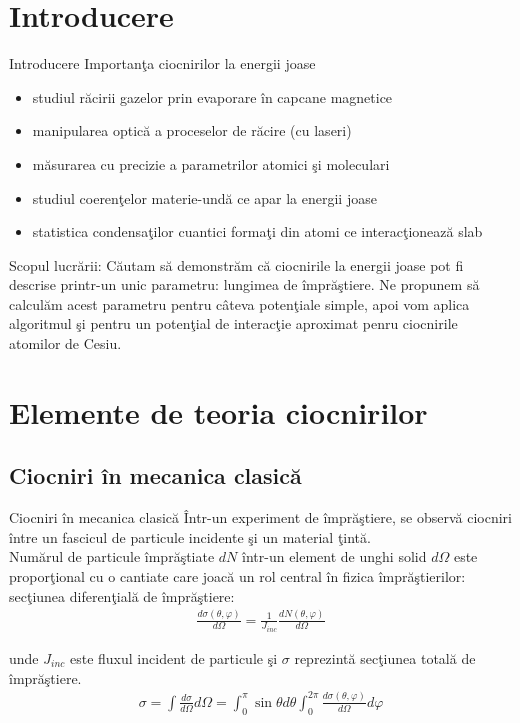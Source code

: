 \section{Introducere}
\begin{frame}[c,allowframebreaks]{Introducere}
Importan\c{t}a ciocnirilor la energii joase\\
\begin{itemize}
  \item studiul r\u{a}cirii gazelor prin evaporare \^{i}n capcane magnetice
  \item manipularea optic\u{a} a proceselor de r\u{a}cire (cu laseri)
  \item m\u{a}surarea cu precizie a parametrilor atomici \c{s}i moleculari
  \item studiul coeren\c{t}elor materie-und\u{a} ce apar la energii joase
  \item statistica condensa\c{t}ilor cuantici forma\c{t}i din atomi ce interac\c{t}ioneaz\u{a} slab
\end{itemize}

Scopul lucr\u{a}rii:
C\u{a}utam s\u{a} demonstr\u{a}m c\u{a} ciocnirile la energii joase pot fi descrise printr-un unic parametru: lungimea de \^{i}mpr\u{a}\c{s}tiere. Ne propunem s\u{a} calcul\u{a}m acest parametru pentru c\^{a}teva poten\c{t}iale simple, apoi vom  aplica algoritmul \c{s}i pentru un poten\c{t}ial de interac\c{t}ie aproximat penru ciocnirile atomilor de Cesiu. 

\end{frame}

\section{Elemente de teoria ciocnirilor}

\subsection{Ciocniri \^{i}n mecanica clasic\u{a}}
\begin{frame}[allowframebreaks]{Ciocniri \^{i}n mecanica clasic\u{a}}
\^{I}ntr-un experiment de \^{i}mpr\u{a}\c{s}tiere, se observ\u{a} ciocniri \^{i}ntre un fascicul de particule incidente \c{s}i un material \c{t}int\u{a}.\\

Num\u{a}rul de particule \^{i}mpr\u{a}\c{s}tiate $dN$ \^{i}ntr-un element de unghi solid $d\Omega$  este propor\c{t}ional cu o cantiate care joac\u{a} un rol central \^{i}n fizica \^{i}mpr\u{a}\c{s}tierilor: sec\c{t}iunea diferen\c{t}ial\u{a} de \^{i}mpr\u{a}\c{s}tiere:
\begin{align}
\frac{d\sigma(\theta,\varphi)}{d\Omega}=\frac{1}{J_{inc}}\frac{dN(\theta,\varphi)}{d\Omega}
\end{align}

unde $J_{inc}$ este fluxul incident de particule \c{s}i $\sigma$ reprezint\u{a} sec\c{t}iunea total\u{a} de \^{i}mpr\u{a}\c{s}tiere.
\begin{align}
\sigma=\int\frac{d\sigma}{d\Omega}d\Omega=\int_{0}^{\pi}\sin\theta d\theta\int_{0}^{2\pi}\frac{d\sigma(\theta,\varphi)}{d\Omega}d\varphi
\end{align} 
\end{frame}


